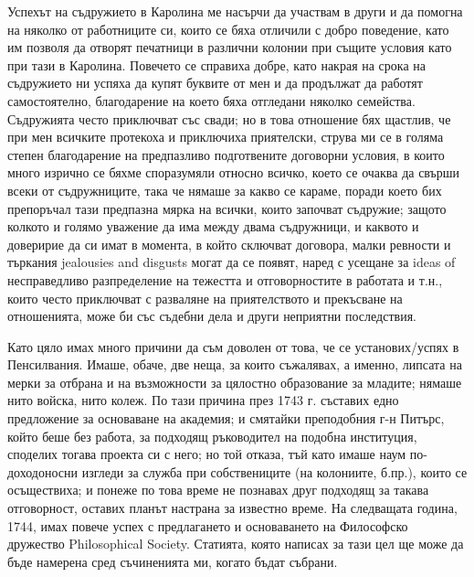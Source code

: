 \documentclass[12pt]{book}
\begin{document}
Успехът на съдружието в Каролина ме насърчи да участвам в други и да помогна на няколко от работниците си, които се бяха отличили с добро поведение, като им позволя да отворят печатници в различни колонии при същите условия като при тази в Каролина. Повечето се справиха добре, като накрая на срока на съдружието ни успяха да купят буквите от мен и да продължат да работят самостоятелно, благодарение на което бяха отгледани няколко семейства. Съдружията често приключват със свади; но в това отношение бях щастлив, че при мен всичките протекоха и приключиха приятелски, струва ми се в голяма степен благодарение на предпазливо подготвените договорни условия, в които много изрично се бяхме споразумяли относно всичко, което се очаква да свърши всеки от съдружниците, така че нямаше за какво се караме, поради което бих препоръчал тази предпазна мярка на всички, които започват съдружие; защото колкото и голямо уважение да има между двама съдружници, и каквото и доверирие да си имат в момента, в който сключват договора, малки ревности и търкания jealousies and disgusts могат да се появят, наред с усещане за ideas of несправедливо разпределение на тежестта и отговорностите в работата и т.н., които често приключват с разваляне на приятелството и прекъсване на отношенията, може би със съдебни дела и други неприятни последствия.

Като цяло имах много причини да съм доволен от това, че се установих/успях в Пенсилвания. Имаше, обаче, две неща, за които съжалявах, а именно, липсата на мерки за отбрана и на възможности за цялостно образование за младите; нямаше нито войска, нито колеж. По тази причина през 1743 г. съставих едно предложение за основаване на академия; и смятайки преподобния г-н Питърс, който беше без работа, за подходящ ръководител на подобна институция, споделих тогава проекта си с него; но той отказа, тъй като имаше наум по-доходоносни изгледи за служба при собствениците (на колониите, б.пр.), които се осъществиха; и понеже по това време не познавах друг подходящ за такава отговорност, оставих планът настрана за известно време. На следващата година, 1744, имах повече успех с предлагането и основаването на Философско дружество Philosophical Society. Статията, която написах за тази цел ще може да бъде намерена сред съчиненията ми, когато бъдат събрани. 
\end{document}
